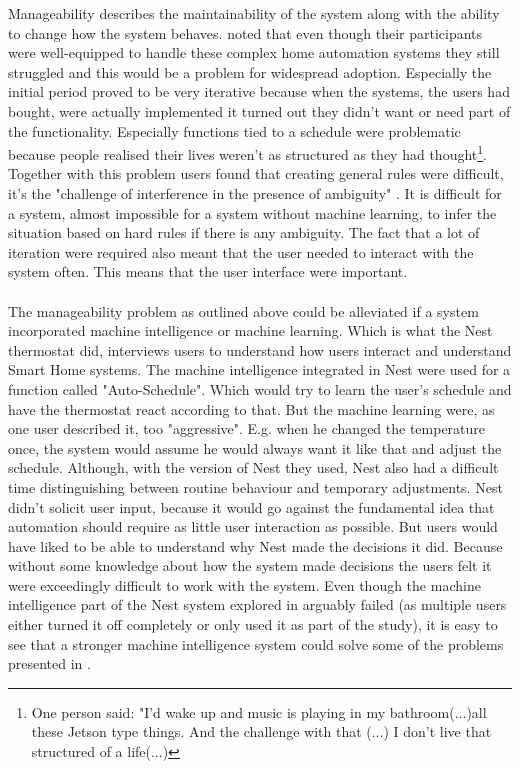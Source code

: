Manageability describes the maintainability of the system along with the ability to change how the system behaves. \cite{HAInterviews} noted that even though their participants were well-equipped to handle these complex home automation systems they still struggled and this would be a problem for widespread adoption. Especially the initial period proved to be very iterative because when the systems, the users had bought, were actually implemented it turned out they didn't want or need part of the functionality. Especially functions tied to a schedule were problematic because people realised their lives weren't as structured as they had thought\footnote{One person said: "I'd wake up and music is playing in my bathroom(...)all these Jetson type things. And the challenge with that (...) I don't live that structured of a life(...)}. Together with this problem users found that creating general rules were difficult, it's the "challenge of interference in the presence of ambiguity" \cite{HAInterviews}. It is difficult for a system, almost impossible for a system without machine learning, to infer the situation based on hard rules if there is any ambiguity. The fact that a lot of iteration were required also meant that the user needed to interact with the system often. This means that the user interface were important.
\\\\
The manageability problem as outlined above could be alleviated if a system incorporated machine intelligence or machine learning. Which is what the Nest thermostat did, \cite{AdaptiveInterviews} interviews users to understand how users interact and understand Smart Home systems. The machine intelligence integrated in Nest were used for a function called "Auto-Schedule". Which would try to learn the user's schedule and have the thermostat react according to that. But the machine learning were, as one user described it\cite{AdaptiveInterviews}, too "aggressive". E.g. when he changed the temperature once, the system would assume he would always want it like that and adjust the schedule. Although, with the version of Nest they used, Nest also had a difficult time distinguishing between routine behaviour and temporary adjustments. Nest didn't solicit user input, because it would go against the fundamental idea that automation should require as little user interaction as possible. But  users would have liked to be able to understand why Nest made the decisions it did. Because without some knowledge about how the system made decisions the users felt it were exceedingly difficult to work with the system.
Even though the machine intelligence part of the Nest system explored in \cite{AdaptiveInterviews} arguably failed (as multiple users either turned it off completely or only used it as part of the study), it is easy to see that a stronger machine intelligence system could solve some of the problems presented in \cite{HAInterviews}. 
